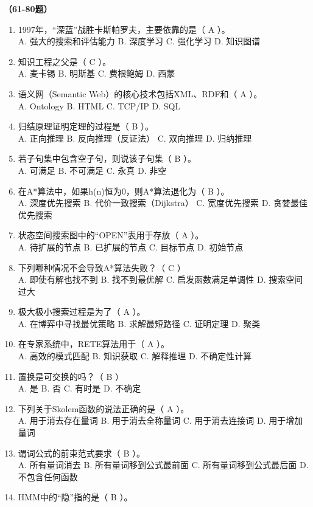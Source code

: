 \vspace{1em}
\textbf{（61-80题）}
\begin{enumerate}[resume,leftmargin=2em,itemsep=1pt]
\item 1997年，“深蓝”战胜卡斯帕罗夫，主要依靠的是（ A ）。
\\ A. 强大的搜索和评估能力 B. 深度学习 C. 强化学习 D. 知识图谱
\item 知识工程之父是（ C ）。
\\ A. 麦卡锡 B. 明斯基 C. 费根鲍姆 D. 西蒙
\item 语义网（Semantic Web）的核心技术包括XML、RDF和（ A ）。
\\ A. Ontology B. HTML C. TCP/IP D. SQL
\item 归结原理证明定理的过程是（ B ）。
\\ A. 正向推理 B. 反向推理（反证法） C. 双向推理 D. 归纳推理
\item 若子句集中包含空子句，则说该子句集（ B ）。
\\ A. 可满足 B. 不可满足 C. 永真 D. 非空
\item 在A*算法中，如果h(n)恒为0，则A*算法退化为（ B ）。
\\ A. 深度优先搜索 B. 代价一致搜索（Dijkstra） C. 宽度优先搜索 D. 贪婪最佳优先搜索
\item 状态空间搜索图中的“OPEN”表用于存放（ A ）。
\\ A. 待扩展的节点 B. 已扩展的节点 C. 目标节点 D. 初始节点
\item 下列哪种情况不会导致A*算法失败？（ C ）
\\ A. 即使有解也找不到 B. 找不到最优解 C. 启发函数满足单调性 D. 搜索空间过大
\item 极大极小搜索过程是为了（ A ）。
\\ A. 在博弈中寻找最优策略 B. 求解最短路径 C. 证明定理 D. 聚类
\item 在专家系统中，RETE算法用于（ A ）。
\\ A. 高效的模式匹配 B. 知识获取 C. 解释推理 D. 不确定性计算
\item 置换是可交换的吗？（ B ）
\\ A. 是 B. 否 C. 有时是 D. 不确定
\item 下列关于Skolem函数的说法正确的是（ A ）。
\\ A. 用于消去存在量词 B. 用于消去全称量词 C. 用于消去连接词 D. 用于增加量词
\item 谓词公式的前束范式要求（ B ）。
\\ A. 所有量词消去 B. 所有量词移到公式最前面 C. 所有量词移到公式最后面 D. 不包含任何函数
\item HMM中的“隐”指的是（ B ）。

\end{enumerate}

